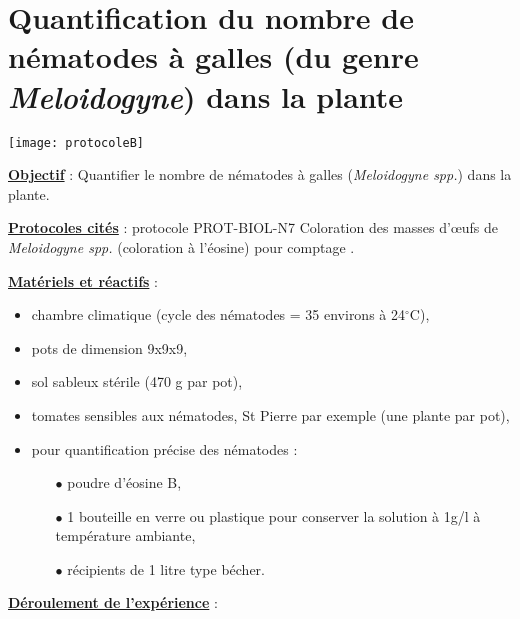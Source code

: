 	
\section[Quantification du nombre de nématodes dans la plante]{Quantification du nombre de nématodes à galles (du genre \textit{Meloidogyne}) dans la plante} \label{secan2}


\hspace{-8mm}
\texttt{[image: protocoleB]}
             
\noindent \textbf{ \underline{Objectif} }: Quantifier le nombre de nématodes à galles (\textit{Meloidogyne spp.}) dans la plante.

\noindent \textbf{ \underline{Protocoles cités} }: protocole PROT-BIOL-N7  \og Coloration des masses d’œufs de \textit{Meloidogyne spp.} (coloration à l’éosine) pour comptage \fg .


\noindent \textbf{ \underline{Matériels et réactifs} }:
\begin{itemize}
\item chambre climatique  (cycle des nématodes = 35 environs  à 24$^{\circ}$C),
\item  pots de dimension  9x9x9,
\item sol sableux stérile (470 g par pot),
\item tomates sensibles aux nématodes, St Pierre par exemple (une plante par pot), 
\item pour quantification précise des nématodes : 
{\small \begin{enumerate}
\item[$\bullet$] poudre d’éosine B,  
\item[$\bullet$] 1 bouteille en verre ou plastique pour conserver la solution à 1g/l à température ambiante,  
\item[$\bullet$] récipients de 1 litre type bécher.
\end{enumerate}}
\end{itemize}


 
\noindent \textbf{ \underline{Déroulement de l'expérience} } : 


